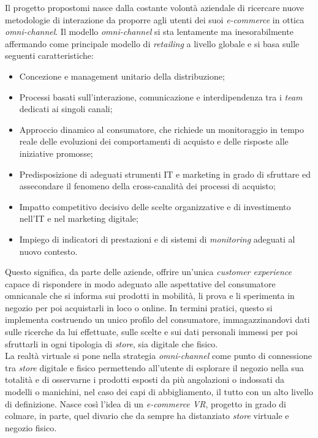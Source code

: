 Il progetto propostomi nasce dalla costante volontà aziendale di ricercare nuove metodologie di interazione da proporre agli utenti dei suoi \textit{e-commerce} in ottica \textit{omni-channel}. Il modello \textit{omni-channel} si sta lentamente ma inesorabilmente affermando come principale modello di \textit{retailing} a livello globale e si basa sulle seguenti caratteristiche:

\begin{itemize}
	\item Concezione e management unitario della distribuzione;
	\item Processi basati sull'interazione, comunicazione e interdipendenza tra i \textit{team} dedicati ai singoli canali;
	\item Approccio dinamico al consumatore, che richiede un monitoraggio in tempo reale delle evoluzioni dei comportamenti di acquisto e delle risposte alle iniziative promosse;
	\item Predisposizione di adeguati strumenti IT e marketing in grado di sfruttare ed assecondare il fenomeno della cross-canalità dei processi di acquisto;
	\item Impatto competitivo decisivo delle scelte organizzative e di investimento nell'IT e nel marketing digitale;
	\item Impiego di indicatori di prestazioni e di sistemi di \textit{monitoring} adeguati al nuovo contesto.
\end{itemize}

Questo significa, da parte delle aziende, offrire un'unica \textit{customer experience} capace di rispondere in modo adeguato alle aspettative del consumatore omnicanale che si informa sui prodotti in mobilità, li prova e li sperimenta in negozio per poi acquistarli in loco o online. In termini pratici, questo si implementa costruendo un unico profilo del consumatore, immagazzinandovi dati sulle ricerche da lui effettuate, sulle scelte e sui dati personali immessi per poi sfruttarli in ogni tipologia di \textit{store}, sia digitale che fisico. \\
La realtà virtuale si pone nella strategia \textit{omni-channel} come punto di connessione tra \textit{store} digitale e fisico permettendo all'utente di esplorare il negozio nella sua totalità e di osservarne i prodotti esposti da più angolazioni o indossati da modelli o manichini, nel caso dei capi di abbigliamento, il tutto con un alto livello di definizione. 
Nasce così l'idea di un \textit{e-commerce VR}, progetto in grado di colmare, in parte, quel divario che da sempre ha distanziato \textit{store} virtuale e negozio fisico.


